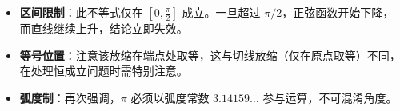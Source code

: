 \begin{trapbox}
\begin{itemize}
    \item \textbf{区间限制}：此不等式仅在 $[0, \frac{\pi}{2}]$ 成立。一旦超过 $\pi/2$，正弦函数开始下降，而直线继续上升，结论立即失效。
    \item \textbf{等号位置}：注意该放缩在端点处取等，这与切线放缩（仅在原点取等）不同，在处理恒成立问题时需特别注意。
    \item \textbf{弧度制}：再次强调，$\pi$ 必须以弧度常数 $3.14159\dots$ 参与运算，不可混淆角度。
\end{itemize}
\end{trapbox}